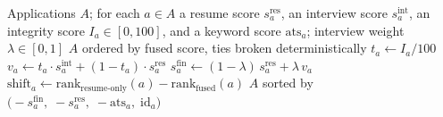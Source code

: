 %

\begin{algorithm}[t]
\caption{Trust-weighted fusion and ranking}
\label{alg:fusion}
\begin{algorithmic}[1]
\Require Applications $A$; for each $a \in A$ a resume score $s^{\text{res}}_a$,
         an interview score $s^{\text{int}}_a$, an integrity score
         $I_a \in [0,100]$, and a keyword score $\text{ats}_a$;
         interview weight $\lambda \in [0,1]$
\Ensure  $A$ ordered by fused score, ties broken deterministically
\Statex
{}
    \State $t_a \gets I_a / 100$
    \State $v_a \gets t_a \cdot s^{\text{int}}_a + (1 - t_a) \cdot s^{\text{res}}_a$
    \State $s^{\text{fin}}_a \gets (1-\lambda)\, s^{\text{res}}_a + \lambda\, v_a$
    \State $\text{shift}_a \gets \text{rank}_{\text{resume-only}}(a) - \text{rank}_{\text{fused}}(a)$
\EndFor
\Statex
\State \Return $A$ sorted by
       $\bigl(-s^{\text{fin}}_a,\; -s^{\text{res}}_a,\; -\text{ats}_a,\;
       \text{id}_a\bigr)$
\end{algorithmic}
\end{algorithm}

